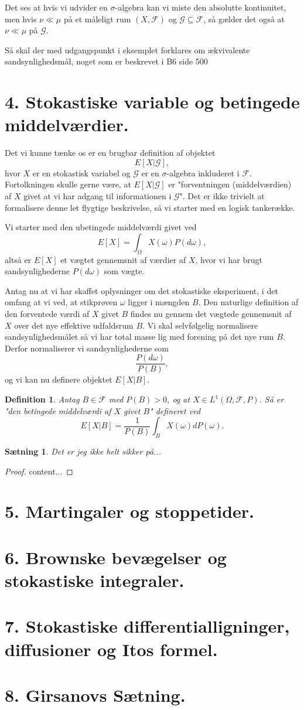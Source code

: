 \documentclass[12pt]{report}
\newtheorem{theorem}[lemma]{Sætning}
\newtheorem{definition}[lemma]{Definition}
\theoremstyle{break}
\newtheorem*{proof}{Bevis}
\theoremstyle{break}
\newcommand{\G}{\mathcal{G}}
\newcommand{\FI}{\mathcal{F}}
\begin{document}
Det ses at hvis vi udvider en $\sigma$-algebra kan vi miste den absolutte kontinuitet, men hvis  $\nu\ll\mu$ på et måleligt rum $(X,\FI)$ og $\G\subseteq\FI$, så gælder det også at $\nu\ll\mu$ på $\G$.

Så skal der med udgangspunkt i eksemplet forklares om ækvivalente sandsynlighedsmål, noget som er beskrevet i B6 side 500



\newpage

\section*{4. Stokastiske variable og betingede middelværdier.}
Det vi kunne tænke os er en brugbar definition af objektet
\[ E[X|\G], \]
hvor $X$ er en stokastisk variabel og $\G$ er en 	$\sigma$-algebra inkluderet i $\FI$. Fortolkningen skulle gerne være, at $E[X|\G]$ er "forventningen (middelværdien) af $X$ givet at vi har adgang til informationen i $\G$". Det er ikke trivielt at formalisere denne let flygtige beskrivelse, så vi starter med en logisk tankerække.

Vi starter med den ubetingede middelværdi givet ved
\[ E[X]=\int_{\Omega}X(\omega)P(d\omega), \]
altså er $E[X]$ et vægtet gennemsnit af værdier af $X$, hvor vi har brugt sandsynlighederne $P(d\omega)$ som vægte.

Antag nu at vi har skaffet oplysninger om det stokastiske eksperiment, i det omfang at vi ved, at stikprøven $\omega$ ligger i mængden $B$. Den naturlige definition af den forventede værdi af $X$ givet $B$ findes nu gennem det vægtede gennemsnit af $X$ over det nye effektive udfaldsrum $B$. Vi skal selvfølgelig normalisere sandsynlighedsmålet så vi har total masse lig med forening på det nye rum $B$. Derfor normaliserer vi sandsynlighederne som 
\[ \frac{P(d\omega)}{P(B)}, \]
og vi kan nu definere objektet $E[X|B]$.
\begin{definition}
	Antag $B\in \FI$ med $P(B)>0$, og at $X\in L^1(\Omega,\FI,P)$. Så er "den betingede middelværdi af $X$ givet $B$"  defineret ved
	\[ E[X|B]=\frac{1}{P(B)}\int_B X(\omega)dP(\omega).\]
\end{definition}
\begin{theorem}
	Det er jeg ikke helt sikker på...
\end{theorem}
\begin{proof}
	content...
\end{proof}
\newpage

\section*{5. Martingaler og stoppetider.}


\newpage

\section*{6. Brownske bevægelser og stokastiske integraler.}


\newpage

\section*{7. Stokastiske differentialligninger, diffusioner og Itos formel.}


\newpage

\section*{8. Girsanovs Sætning.}
\end{document}
